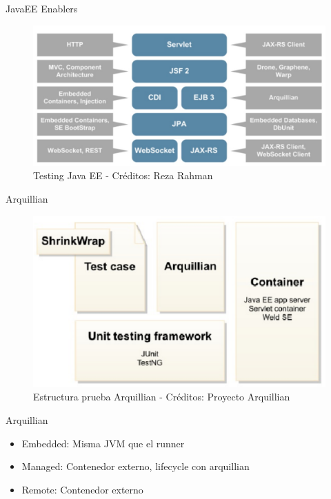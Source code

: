 \documentclass{beamer}
\begin{document}
\begin{frame}{JavaEE Enablers}

		\begin{figure}
			\centering
			\includegraphics[width=0.8\linewidth]{Images/testingee}
				\caption{Testing Java EE - Créditos: Reza Rahman}
		\end{figure}

\end{frame}


\begin{frame}{Arquillian}

\begin{figure}
	\centering
	\includegraphics[width=0.8\linewidth]{Images/arquillian}
		\caption{Estructura prueba Arquillian - Créditos: Proyecto Arquillian}
\end{figure}

\end{frame}



\begin{frame}{Arquillian}
\begin{itemize}
	\item Embedded: Misma JVM que el runner
	\item Managed: Contenedor externo, lifecycle con arquillian
	\item Remote: Contenedor externo
\end{itemize}
\end{frame}
\end{document}
